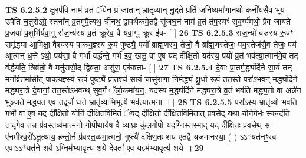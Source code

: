 \documentclass[17pt]{extarticle}
\begin{document}
                  \newline
                                \textbf{ TS 6.2.5.2} \newline
                  क्षु॒रप॑वि॒ नाम॑ व्र॒तं ॅयेन॒ प्र जा॒तान् भ्रातृ॑व्यान् नु॒दते॒ प्रति॑ जनि॒ष्यमा॑णा॒नथो॒ कनी॑यसै॒व भूय॒ उपै॑ति च॒तुरोऽग्रे॒ स्तना᳚न् व्र॒तमुपै॒त्यथ॒ त्रीनथ॒ द्वावथैक॑मे॒तद्वै सु॑जघ॒नं नाम॑ व्र॒तं त॑प॒स्यꣳ॑ सुव॒र्ग्य॑मथो॒ प्रैव जा॑यते प्र॒जया॑ प॒शुभि॑र्यवा॒गू रा॑ज॒न्य॑स्य व्र॒तं क्रू॒रेव॒ वै य॑वा॒गूः क्रू॒र इ॑व- [  ] \textbf{  26} \newline
                  \newline
                                \textbf{ TS 6.2.5.3} \newline
                  राज॒न्यो॑ वज्र॑स्य रू॒पꣳ समृ॑द्ध्या आ॒मिक्षा॒ वैश्य॑स्य पाकय॒ज्ञ्स्य॑ रू॒पं पुष्ट्यै॒ पयो᳚ ब्राह्म॒णस्य॒ तेजो॒ वै ब्रा᳚ह्म॒णस्तेजः॒ पय॒स्तेज॑सै॒व तेजः॒ पय॑ आ॒त्मन् ध॒त्ते ऽथो॒ पय॑सा॒ वै गर्भा॑ वर्द्धन्ते॒ गर्भ॑ इव॒ खलु॒ वा ए॒ष यद् दी᳚क्षि॒तो यद॑स्य॒ पयो᳚ व्र॒तं भव॑त्या॒त्मान॑मे॒व तद् व॑र्द्धयति॒ त्रिव्र॑तो॒ वै मनु॑रासी॒द् द्विव्र॑ता॒ असु॑रा॒ एक॑व्रता- [  ] \textbf{  27} \newline
                  \newline
                                \textbf{ TS 6.2.5.4} \newline
                  दे॒वाः प्रा॒तर्म॒द्ध्यंदि॑ने सा॒यं तन् मनो᳚र्व्र॒तमा॑सीत् पाकय॒ज्ञ्स्य॑ रू॒पं पुष्ट्यै᳚ प्रा॒तश्च॑ सा॒यं चासु॑राणां निर्म॒द्ध्यं क्षु॒धो रू॒पं तत॒स्ते परा॑ऽभवन् म॒द्ध्यंदि॑ने मद्ध्यरा॒त्रे दे॒वानां॒ तत॒स्ते॑ऽभवन्थ् सुव॒र्गं ॅलो॒कमा॑य॒न्॒. यद॑स्य म॒द्ध्यंदि॑ने मद्ध्यरा॒त्रे व्र॒तं भव॑ति मद्ध्य॒तो वा अन्ने॑न भुञ्जते मद्ध्य॒त ए॒व तदूर्जं॑ धत्ते॒ भ्रातृ॑व्याभिभूत्यै॒ भव॑त्या॒त्मना॒- [  ] \textbf{  28} \newline
                  \newline
                                \textbf{ TS 6.2.5.5} \newline
                  परा᳚ऽस्य॒ भ्रातृ॑व्यो भवति॒ गर्भो॒ वा ए॒ष यद् दी᳚क्षि॒तो योनि॑ र्दीक्षितविमि॒तं ॅयद् दी᳚क्षि॒तो दी᳚क्षितविमि॒तात् प्र॒वसे॒द् यथा॒ योने॒र्गर्भः॒ स्कन्द॑ति ता॒दृगे॒व तन्न प्र॑वस्त॒व्य॑मा॒त्मनो॑ गोपी॒थायै॒ष वै व्या॒घ्रः कु॑लगो॒पो यद॒ग्निस्तस्मा॒द् यद् दी᳚क्षि॒तः प्र॒वसे॒थ् स ए॑नमीश्व॒रो॑ऽनू॒त्थाय॒ हन्तो॒र्न प्र॑वस्त॒व्य॑मा॒त्मनो॒ गुप्त्यै॑ दक्षिण॒तः श॑य ए॒तद्वै यज॑मानस्या॒ ( ) ऽऽ*यत॑नꣳ॒॒स्व ए॒वाऽऽ*यत॑ने शये॒ ऽग्निम॑भ्या॒वृत्य॑ शये दे॒वता॑ ए॒व य॒ज्ञ्म॑भ्या॒वृत्य॑ शये ॥ \textbf{  29 } \newline
                  \newline
\end{document}
